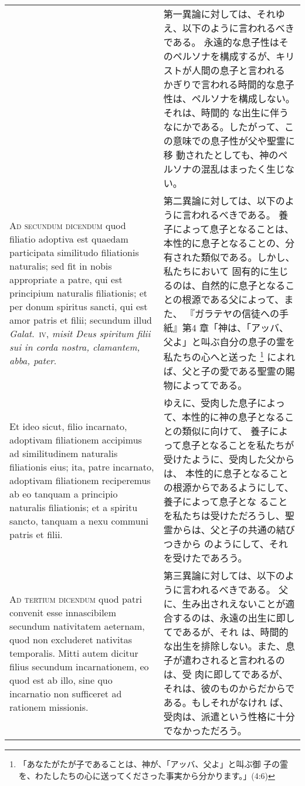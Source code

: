 \documentclass[10pt]{jsarticle} %
\begin{document}
\begin{longtable}{p{21em}p{21em}}
&

第一異論に対しては、それゆえ、以下のように言われるべきである。
永遠的な息子性はそのペルソナを構成するが、キリストが人間の息子と言われる
 かぎりで言われる時間的な息子性は、ペルソナを構成しない。それは、時間的
 な出生に伴うなにかである。したがって、この意味での息子性が父や聖霊に移
 動されたとしても、神のペルソナの混乱はまったく生じない。


\\



{\scshape Ad secundum dicendum} quod filiatio adoptiva est quaedam participata
similitudo filiationis naturalis; sed fit in nobis appropriate a patre,
qui est principium naturalis filiationis; et per donum spiritus sancti,
qui est amor patris et filii; secundum illud {\itshape Galat}.~{\scshape iv}, {\itshape misit Deus
spiritum filii sui in corda nostra, clamantem, abba, pater}. 


&

第二異論に対しては、以下のように言われるべきである。
養子によって息子となることは、
 本性的に息子となることの、分有された類似である。しかし、私たちにおいて
 固有的に生じるのは、自然的に息子となることの根源である父によって、また、
 『ガラテヤの信徒への手紙』第4
 章「神は、「アッバ、父よ」と叫ぶ自分の息子の霊を私たちの心へと送った
 \footnote{「あなたがたが子であることは、神が、「アッバ、父よ」と叫ぶ御
 子の霊を、わたしたちの心に送ってくださった事実から分かります。」(4:6)}
 によれば、父と子の愛である聖霊の賜物によってである。

\\

Et ideo
sicut, filio incarnato, adoptivam filiationem accipimus ad similitudinem
naturalis filiationis eius; ita, patre incarnato, adoptivam filiationem
reciperemus ab eo tanquam a principio naturalis filiationis; et a
spiritu sancto, tanquam a nexu communi patris et filii.


&

ゆえに、受肉した息子によって、本性的に神の息子となることの類似に向けて、
 養子によって息子となることを私たちが受けたように、受肉した父からは、
 本性的に息子となることの根源からであるようにして、養子によって息子とな
 ることを私たちは受けただろうし、聖霊からは、父と子の共通の結びつきから
 のようにして、それを受けたであろう。


\\



{\scshape Ad tertium dicendum} quod patri convenit esse innascibilem secundum
nativitatem aeternam, quod non excluderet nativitas temporalis. Mitti
autem dicitur filius secundum incarnationem, eo quod est ab illo, sine
quo incarnatio non sufficeret ad rationem missionis.


&

第三異論に対しては、以下のように言われるべきである。
父に、生み出されえないことが適合するのは、永遠の出生に即してであるが、それ
 は、時間的な出生を排除しない。また、息子が遣わされると言われるのは、受
 肉に即してであるが、それは、彼のものからだからである。もしそれがなけれ
 ば、受肉は、派遣という性格に十分でなかっただろう。



\end{longtable}
\end{document}
